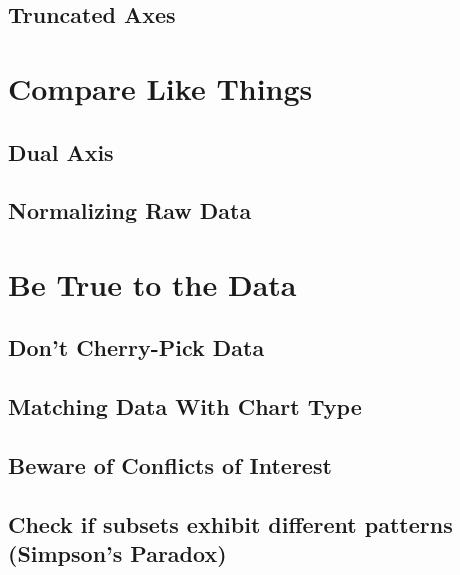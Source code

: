 \documentclass[
]{krantz}
\begin{document}
\hypertarget{truncated-axes}{%
\subsection{Truncated Axes}\label{truncated-axes}}

\hypertarget{compare-like-things}{%
\section{Compare Like Things}\label{compare-like-things}}

\hypertarget{dual-axis}{%
\subsection{Dual Axis}\label{dual-axis}}

\hypertarget{normalizing-raw-data}{%
\subsection{Normalizing Raw Data}\label{normalizing-raw-data}}

\hypertarget{be-true-to-the-data}{%
\section{Be True to the Data}\label{be-true-to-the-data}}

\hypertarget{dont-cherry-pick-data}{%
\subsection{Don't Cherry-Pick Data}\label{dont-cherry-pick-data}}

\hypertarget{matching-data-with-chart-type}{%
\subsection{Matching Data With Chart Type}\label{matching-data-with-chart-type}}

\hypertarget{beware-of-conflicts-of-interest}{%
\subsection{Beware of Conflicts of Interest}\label{beware-of-conflicts-of-interest}}

\hypertarget{check-if-subsets-exhibit-different-patterns-simpsons-paradox}{%
\subsection{Check if subsets exhibit different patterns (Simpson's Paradox)}\label{check-if-subsets-exhibit-different-patterns-simpsons-paradox}}
\end{document}
